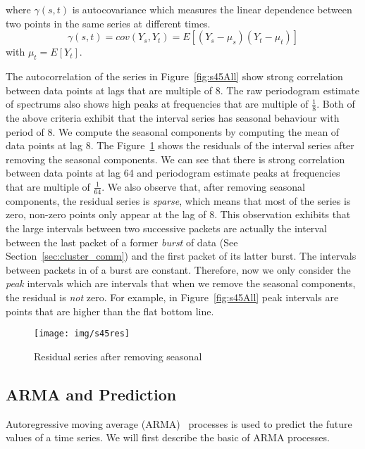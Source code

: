 \documentclass[12pt]{article}
\begin{document}
where $\gamma(s,t)$ is autocovariance which measures the linear dependence
between two points in the same series at different times.
\begin{equation}
\gamma(s,t)=cov(Y_s, Y_t)=E[(Y_s-\mu_s)(Y_t-\mu_t)]
\end{equation}
with $\mu_t=E[Y_t]$.

The autocorrelation of the series in Figure~\ref{fig:s45All} show strong
correlation between data points at lags that are multiple of 8. The raw
periodogram estimate of spectrums also shows high peaks at frequencies that are
multiple of $\frac{1}{8}$. Both of the above criteria exhibit that the interval
series has seasonal behaviour with period of 8. We compute the seasonal
components by computing the mean of data points at lag 8. The
Figure~\ref{fig:s45res} shows the residuals of the interval series after
removing the seasonal components. We can see that there is strong correlation
between data points at lag 64 and periodogram estimate peaks at frequencies
that are multiple of $\frac{1}{64}$. We also observe that, after removing
seasonal components, the residual series is \textit{sparse}, which means that
most of the series is zero, non-zero points only appear at the lag of 8. This
observation exhibits that the large intervals between two successive packets are
actually the interval between the last packet of a former \textit{burst} of data
(See Section~\ref{sec:cluster_comm}) and the first packet of its latter burst.
The intervals between packets in of a burst are constant. Therefore, now we only
consider the \textit{peak} intervals which are intervals that when we remove
the seasonal components, the residual is \textit{not} zero. For example, in
Figure~\ref{fig:s45All} peak intervals are points that are higher than the flat
bottom line.

\begin{figure}[ht!]
\centering
\texttt{[image: img/s45res]}
\caption{Residual series after removing seasonal}\label{fig:s45res}
\end{figure}



\subsection{ARMA and Prediction}
Autoregressive moving average (ARMA)~\cite{BoxTimeSeries, FalkStatSAS}
 processes is used to predict the future values of a time series. We will first
 describe the basic of ARMA processes.
 
\end{document}
